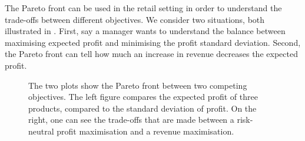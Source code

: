 \documentclass[main.tex]{subfiles}
\begin{document}
\begin{example}\label{ex:retail_pareto}
  The Pareto front can be used in the retail setting in order to understand the
  trade-offs between different objectives.
  We consider two situations, both illustrated in
  .
  First, say a manager wants to understand the balance between
  maximising expected profit and minimising the profit standard
  deviation.
  Second, the Pareto front can tell how much an increase in revenue
  decreases the expected profit.
  \begin{figure}[htbp]
    \centering
    \begin{subfigure}[h]{.5\textwidth}
    \end{subfigure}%
    \begin{subfigure}[h]{.5\textwidth}
    \end{subfigure}
    \caption{The two plots show the Pareto front between two competing
      objectives. The left figure compares the expected profit of three
      products, compared to the standard deviation of profit.
      On the right, one can see the trade-offs that are made between
      a risk-neutral profit maximisation and a revenue maximisation.
    }\label{fig:pareto_std_prof_rev}
  \end{figure}


\end{example}
\end{document}
